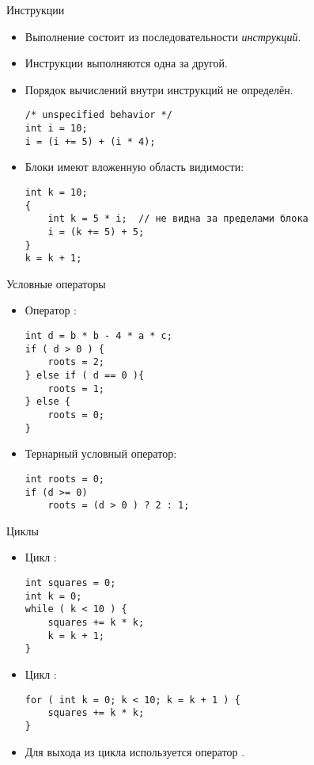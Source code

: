 \documentclass[aspectration=1610,t]{beamer}
\begin{document}
\begin{frame}[fragile]{Инструкции}
    \begin{itemize}
        \item Выполнение состоит из последовательности {\em инструкций}.

        \item Инструкции выполняются одна за другой.

        \item Порядок вычислений внутри инструкций не определён.
            \begin{lstlisting}
/* unspecified behavior */
int i = 10;
i = (i += 5) + (i * 4); 
            \end{lstlisting}
        \item Блоки имеют вложенную область видимости:
            \begin{lstlisting}
int k = 10;                
{   
    int k = 5 * i;  // не видна за пределами блока
    i = (k += 5) + 5; 
}
k = k + 1;
            \end{lstlisting}

    \end{itemize}
\end{frame}

\begin{frame}[fragile]{Условные операторы}
\begin{itemize}    
    \item Оператор :
    \begin{lstlisting}
int d = b * b - 4 * a * c;
if ( d > 0 ) {
    roots = 2;
} else if ( d == 0 ){  
    roots = 1;
} else {
    roots = 0;
}
    \end{lstlisting}

    \item Тернарный условный оператор:
    \begin{lstlisting}
int roots = 0;
if (d >= 0)
    roots = (d > 0 ) ? 2 : 1;
    \end{lstlisting}
\end{itemize}
\end{frame}

\begin{frame}[fragile]{Циклы}
\begin{itemize}    
    \item Цикл :
    \begin{lstlisting}
int squares = 0;
int k = 0; 
while ( k < 10 ) {
    squares += k * k;
    k = k + 1;
} 
    \end{lstlisting}

    \item Цикл :
    \begin{lstlisting}
for ( int k = 0; k < 10; k = k + 1 ) {
    squares += k * k;
} 
    \end{lstlisting}
\item Для выхода из цикла используется оператор .
\end{itemize}
\end{frame}
\end{document}
